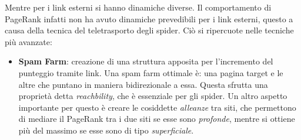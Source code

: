 Mentre per i link esterni si hanno dinamiche diverse. Il comportamento di PageRank infatti non ha avuto dinamiche prevedibili per i link esterni, questo a causa della tecnica del teletrasporto degli spider. Ci\`o si ripercuote nelle tecniche pi\`u avanzate:
\begin{itemize}

\item \textbf{Spam Farm}: creazione di una struttura apposita per l'incremento del punteggio tramite link. Una spam farm ottimale \`e: una pagina target e le altre che puntano in maniera bidirezionale a essa. Questa sfrutta una propriet\`a detta \textit{reachbility}, che \`e essenziale per gli spider. Un altro aspetto importante per questo \`e creare le cosiddette \textit{alleanze} tra siti, che permettono di mediare il PageRank tra i due siti se esse sono \textit{profonde}, mentre si ottiene pi\`u del massimo se esse sono di tipo \textit{superficiale}.

\end{itemize}
